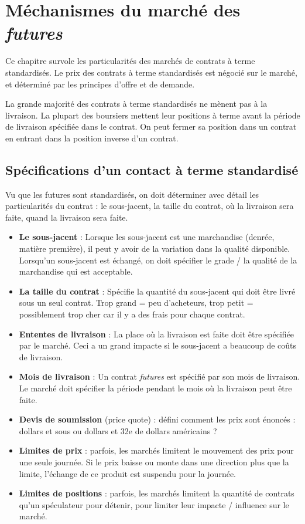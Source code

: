 \chapter{Méchanismes du marché des \textit{futures}}

Ce chapitre survole les particularités des marchés de contrats à terme standardisés. Le prix des contrats à terme standardisés est négocié sur le marché, et déterminé par les principes d'offre et de demande. 

La grande majorité des contrats à terme standardisés ne mènent pas à la livraison. La plupart des boursiers mettent leur positions à terme avant la période de livraison spécifiée dans le contrat. On peut fermer sa position dans un contrat en entrant dans la position inverse d'un contrat. 

\section{Spécifications d'un contact à terme standardisé}

Vu que les futures sont standardisés, on doit déterminer avec détail les particularités du contrat : le sous-jacent, la taille du contrat, où la livraison sera faite, quand la livraison sera faite. 

\begin{itemize}
	\item \textbf{Le sous-jacent} : Lorsque les sous-jacent est une marchandise (denrée, matière première), il peut y avoir de la variation dans la qualité disponible. Lorsqu'un sous-jacent est échangé, on doit spécifier le grade / la qualité de la marchandise qui est acceptable. 
	\item \textbf{La taille du contrat} : Spécifie la quantité du sous-jacent qui doit être livré sous un seul contrat. Trop grand = peu d'acheteurs, trop petit = possiblement trop cher car il y a des frais pour chaque contrat. 
	\item \textbf{Ententes de livraison} : La place où la livraison est faite doit être spécifiée par le marché. Ceci a un grand impacte si le sous-jacent a beaucoup de coûts de livraison. 
	\item \textbf{Mois de livraison} : Un contrat \textit{futures} est spécifié par son mois de livraison. Le marché doit spécifier la période pendant le mois où la livraison peut être faite. 
	\item \textbf{Devis de soumission} (price quote) : défini comment les prix sont énoncés : dollars et sous ou dollars et 32e de dollars américains ?
	\item \textbf{Limites de prix} : parfois, les marchés limitent le mouvement des prix pour une seule journée. Si le prix baisse ou monte dans une direction plus que la limite, l'échange de ce produit est suspendu pour la journée. 
	\item \textbf{Limites de positions} : parfois, les marchés limitent la quantité de contrats qu'un spéculateur pour détenir, pour limiter leur impacte / influence sur le marché. 
\end{itemize}


